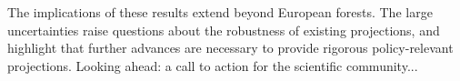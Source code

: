 \documentclass[11pt,letter]{article}
\begin{document}
The implications of these results extend beyond European forests. The large uncertainties raise questions about the robustness of existing projections, and highlight that further advances are necessary to provide rigorous policy-relevant projections.
Looking ahead: a call to action for the scientific community...


\clearpage


\end{document}
